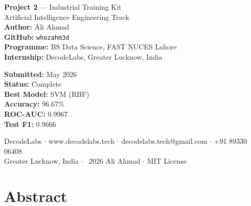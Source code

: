 \documentclass[12pt, a4paper]{report}
\begin{document}
\begin{titlepage}
  \begin{minipage}[t]{0.55\textwidth}
    {\color{white!80}\fontsize{10}{16}\selectfont
      \textbf{\color{white}Project 2} — Industrial Training Kit\\
      Artificial Intelligence Engineering Track\\[8pt]
      \textbf{\color{white}Author:} Ali Ahmad\\
      \textbf{\color{white}GitHub:} \texttt{whozahm3d}\\
      \textbf{\color{white}Programme:} BS Data Science, FAST NUCES Lahore\\
      \textbf{\color{white}Internship:} DecodeLabs, Greater Lucknow, India
    }
  \end{minipage}
  \hfill
  \begin{minipage}[t]{0.40\textwidth}
    {\color{white!80}\fontsize{10}{16}\selectfont
      \textbf{\color{white}Submitted:} May 2026\\
      \textbf{\color{white}Status:} Complete\\[8pt]
      \textbf{\color{white}Best Model:} SVM (RBF)\\
      \textbf{\color{white}Accuracy:} 96.67\%\\
      \textbf{\color{white}ROC-AUC:} 0.9967\\
      \textbf{\color{white}Test F1:} 0.9666
    }
  \end{minipage}

  \vfill


  \vspace{0.4cm}
  {\color{white!50}\fontsize{8}{12}\selectfont
    DecodeLabs $\cdot$ www.decodelabs.tech $\cdot$
    decodelabs.tech@gmail.com $\cdot$ +91 89330 06408\\
    Greater Lucknow, India $\cdot$ \textcopyright\ 2026 Ali Ahmad $\cdot$ MIT License
  }

  \nopagecolor
\end{titlepage}

\newpage\thispagestyle{empty}\mbox{}\newpage

\chapter*{Abstract}
\thispagestyle{fancy}
\end{document}
